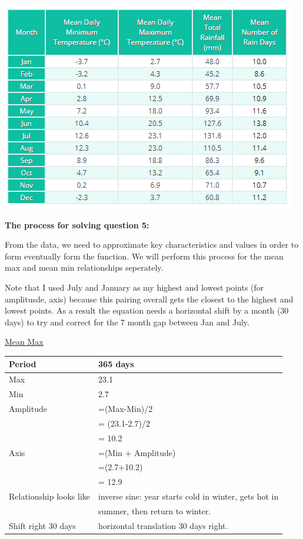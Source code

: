 \documentclass[12pt]{book}
\begin{document}
\begin{enumerate}
\begin{center}
    \includegraphics{mean minmax.PNG}
\end{center}

\vspace{0.3cm}
\textbf{The process for solving question 5:}

\vspace{0.3cm}
From the data, we need to approximate key characteristics and values in order to form 
eventually form the function. We will perform this process for the mean max and mean 
min relationships seperately.

\vspace{0.3cm}
Note that I used July and January as my highest and lowest points (for amplitusde, axis) 
because this pairing overall gets the closest to the highest and lowest points. As a result 
the equation needs a horizontal shift by a month (30 days) to try and correct for the 7 month 
gap between Jan and July.

\vspace{0.3cm}
\underline{Mean Max}

\vspace{0.3cm}
\begin{tabular}{|l|l|}
    \hline
    Period & 365 days \\
    \hline
    Max & 23.1 \\
    \hline
    Min & 2.7 \\
    \hline
    Amplitude & =(Max-Min)/2\\
    & = (23.1-2.7)/2 \\
    & = 10.2 \\
    \hline
    Axis & =(Min + Amplitude)\\
    & =(2.7+10.2) \\
    & = 12.9 \\
    \hline
    Relationship looks like & inverse sine: year starts cold in winter, gets hot in \\
    & summer, then return to winter. \\
    \hline
    Shift right 30 days & horizontal translation 30 days right. \\
    \hline
\end{tabular}


\end{enumerate}
\end{document}

